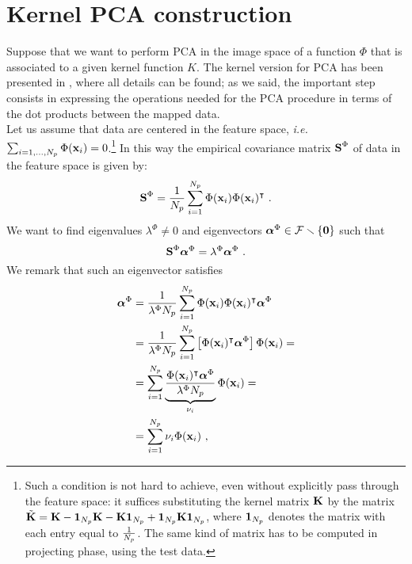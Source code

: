 \chapter{Kernel PCA construction}\label{app:KPCA}

Suppose that we want to perform PCA in the image space of a function $\Phi$ that is associated to a given kernel function $K$. The kernel version for PCA has been presented in \cite{scholkopf1998nonlinear}, where all details can be found; as we said, the important step consists in expressing the operations needed for the PCA procedure in terms of the dot products between the mapped data.\\

Let us assume that data are centered in the feature space, {\em i.e.} $\sum_{i=1,\dots,N_p}\Phi(\textbf{x}_{i})=0$.\footnote{Such a condition is not hard to achieve, even without explicitly pass through the feature space: it suffices substituting the kernel matrix $\textbf{K}$ by the matrix $\tilde{\textbf{K}} = \textbf{K} - \boldsymbol{1}_{N_p}\textbf{K} - \textbf{K}\boldsymbol{1}_{N_p} + \boldsymbol{1}_{N_p}\textbf{K}\boldsymbol{1}_{N_p}$, where $\boldsymbol{1}_{N_p}$ denotes the matrix with each entry equal to $\frac{1}{N_p}$. The same kind of matrix has to be computed in projecting phase, using the test data.} In this way the empirical covariance matrix $\textbf{S}^\Phi$ of data in the feature space is given by:
\begin{equation}
\textbf{S}^\Phi = \frac{1}{N_p} \sum_{i=1}^{N_p}\Phi(\textbf{x}_{i})\Phi(\textbf{x}_{i})^\intercal \mbox{ .}
\end{equation} 
We want to find eigenvalues $\lambda^\Phi \neq 0$ and eigenvectors $\boldsymbol{\alpha}^\Phi\in \mathcal{F}\smallsetminus \{\boldsymbol{0}\}$ such that
\begin{equation}\label{eq:eigProblem}
\textbf{S}^\Phi\boldsymbol{\alpha}^\Phi = \lambda^\Phi \boldsymbol{\alpha}^\Phi \mbox{ .}
\end{equation}
We remark that such an eigenvector satisfies
\begin{align}
\boldsymbol{\alpha}^\Phi &= \frac{1}{\lambda^\Phi N_p}\sum_{i=1}^{N_p} \Phi(\textbf{x}_{i})\Phi(\textbf{x}_{i})^\intercal \boldsymbol{\alpha}^\Phi\\
\label{eq:passaggio}
&=  \frac{1}{\lambda^\Phi N_p}\sum_{i=1}^{N_p} \left[\Phi(\textbf{x}_{i})^\intercal \boldsymbol{\alpha}^\Phi\right] \Phi(\textbf{x}_{i}) =  \\
&= \sum_{i=1}^{N_p}\underbrace{\frac{\Phi(\textbf{x}_{i})^\intercal \boldsymbol{\alpha}^\Phi}{\lambda^\Phi N_p}}_{\nu_i}\Phi(\textbf{x}_{i}) = \\
\label{eq:linearComb}
&= \sum_{i=1}^{N_p}\nu_i \Phi(\textbf{x}_{i})\mbox{ ,}
\end{align}
